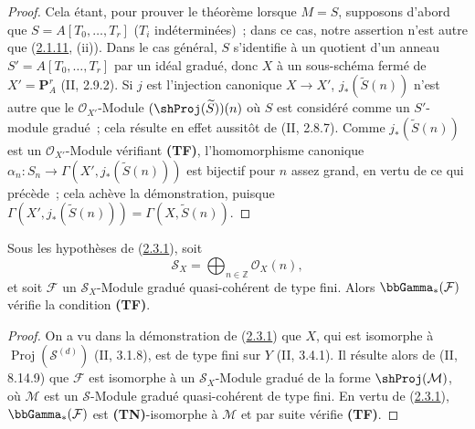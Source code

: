 \begin{proof}
Cela étant, pour prouver le théorème lorsque $M=S$, supposons d'abord que
$S=A[T_0,\ldots,T_r]$ ($T_i$ indéterminées)~; dans ce cas, notre assertion
n'est autre que (\hyperref[III.2.1.11-fr]{2.1.11}, (ii)). Dans le cas
général, $S$ s'identifie à un quotient d'un anneau
$S'=A[T_0,\ldots,T_r]$ par un idéal gradué, donc $X$ à un sous-schéma
fermé de $X'=\mathbf P_A^r$ (II, 2.9.2). Si $j$ est l'injection canonique
$X\to X'$, $j_*(\widetilde S(n))$ n'est autre que le
$\mathcal O_{X'}$-Module $(\shProj(\widetilde S))(n)$ où $S$ est considéré
comme un $S'$-module gradué~; cela résulte en effet aussitôt de
(II, 2.8.7). Comme $j_*(\widetilde S(n))$ est un
$\mathcal O_{X'}$-Module vérifiant \textbf{(TF)}, l'homomorphisme canonique
$\alpha_n:S_n\to\Gamma(X',j_*(\widetilde S(n)))$ est bijectif pour $n$
assez grand, en vertu de ce qui précède~; cela achève la démonstration,
puisque
$\Gamma(X',j_*(\widetilde S(n)))=\Gamma(X,\widetilde S(n))$.
\end{proof}

\begin{corollary}[2.3.2]
\label{III.2.3.2-fr}
Sous les hypothèses de (\hyperref[III.2.3.1-fr]{2.3.1}), soit
\[
\mathcal S_X=\bigoplus_{n\in\mathbb Z}\mathcal O_X(n),
\]
et soit $\mathcal F$ un $\mathcal S_X$-Module gradué quasi-cohérent de
type fini. Alors $\bbGamma_*(\mathcal F)$ vérifie la condition
\textbf{(TF)}.
\end{corollary}

\begin{proof}
On a vu dans la démonstration de
(\hyperref[III.2.3.1-fr]{2.3.1}) que $X$, qui est isomorphe à
$\operatorname{Proj}(\mathcal S^{(d)})$ (II, 3.1.8), est de type fini sur
$Y$ (II, 3.4.1). Il résulte alors de (II, 8.14.9) que $\mathcal F$ est
isomorphe à un $\mathcal S_X$-Module gradué de la forme
$\shProj(\mathcal M)$, où $\mathcal M$ est un $\mathcal S$-Module gradué
quasi-cohérent de type fini. En vertu de
(\hyperref[III.2.3.1-fr]{2.3.1}), $\bbGamma_*(\mathcal F)$ est
\textbf{(TN)}-isomorphe à $\mathcal M$ et par suite vérifie
\textbf{(TF)}.
\end{proof}

